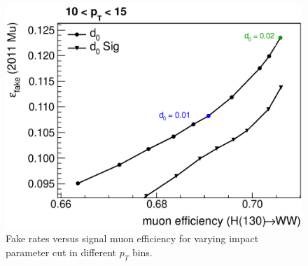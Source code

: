 \begin{figure}[!htbp]
\begin{center}
\includegraphics[scale=0.4]{figures/ipscan2.eps}
\caption{Fake rates versus signal muon efficiency for varying impact parameter cut in different $p_T$ bins.}
\label{fig:ipscan}
\end{center}
\end{figure}

